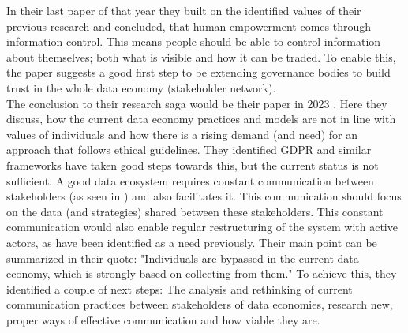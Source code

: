 \documentclass[a4paper,11pt]{report} %
\theoremstyle{change}
\theoremstyle{theoremstyle}
\begin{document}
In their last paper of that year \cite{rantanen2020respecting} they built on the  identified values of their previous research and concluded, that human empowerment comes through information control. This means people should be able to control information about themselves; both what is visible and how it can be traded. To enable this, the paper suggests a good first step to be extending governance bodies to build trust in the whole data economy (stakeholder network).\\  
The conclusion to their research saga would be their paper in 2023 \cite{koskinen2023ethical}. Here they discuss, how the current data economy practices and models are not in line with values of individuals and how there is a rising demand (and need) for an approach that follows ethical guidelines. They identified GDPR and similar frameworks have taken good steps towards this, but the current status is not sufficient. A good data ecosystem requires constant communication between stakeholders (as seen in \cite{rantanen2020humans}) and also facilitates it. This communication should focus on the data (and strategies) shared between these stakeholders. This constant communication would also enable regular restructuring of the system with active actors, as have been identified as a need previously. Their main point can be summarized in their quote: "Individuals are bypassed in the current data economy, which is strongly based on collecting from them." To achieve this, they identified a couple of next steps: The analysis and rethinking of current communication practices between stakeholders of data economies, research new, proper ways of effective communication and how viable they are.\\
\end{document}
